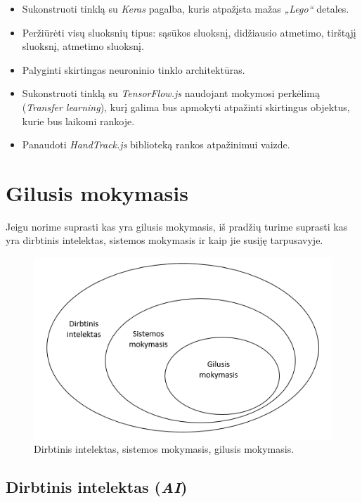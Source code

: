 \documentclass{VUMIFInfKursinis}
\begin{document}
\begin{itemize}
  \item Sukonstruoti tinklą su \textit{Keras} pagalba, kuris atpažįsta mažas \textit{„Lego“} detales.
  \item Peržiūrėti visų sluoksnių tipus: sąsūkos sluoksnį, didžiausio atmetimo, tirštąjį sluoksnį, atmetimo sluoksnį.
  \item Palyginti skirtingas neuroninio tinklo architektūras.
  \item Sukonstruoti tinklą su \textit{TensorFlow.js} naudojant mokymosi perkėlimą (\textit{Transfer learning}), kurį galima bus apmokyti atpažinti skirtingus objektus, kurie bus laikomi rankoje.
  \item Panaudoti \textit{HandTrack.js} biblioteką rankos atpažinimui vaizde.
\end{itemize} 



\section{Gilusis mokymasis}
\vspace{10mm}


Jeigu norime suprasti kas yra gilusis mokymasis, iš pradžių turime suprasti kas yra dirbtinis intelektas, sistemos mokymasis ir kaip jie susiję tarpusavyje.

\begin{figure}[h!]
\centering
  \includegraphics[scale=1.0]{img/figure_1-1}
  \caption{Dirbtinis intelektas, sistemos mokymasis, gilusis mokymasis.}
  \label{fig:AI}
\end{figure}

\subsection{Dirbtinis intelektas (\textit{AI})}
\end{document}
